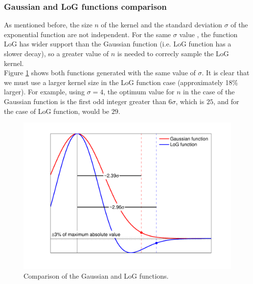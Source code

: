 \documentclass{ipol}
\numberwithin{equation}{section}
\numberwithin{table}{section}
\begin{document}

\subsubsection{Gaussian and LoG functions comparison}
\label{kernelcomparison}

As mentioned before, the size $n$ of the kernel and the standard deviation $\sigma$ of the exponential function 
are not independent. For the same $\sigma$ value , the function LoG has wider support than the
Gaussian function (i.e. LoG function has a slower decay), so a greater value of $n$ is needed to correcly sample the LoG kernel.\\

Figure \ref{fig:kernels} shows both functions generated with the same value of $\sigma$. It is clear that we must use a larger kernel size in the LoG function case (approximately 18\% larger). For 
example, using $\sigma=4$, the optimum value for $n$ in the case of the Gaussian function is the 
first odd integer greater than $6\sigma$, which is $25$, and for the case of LoG function, would 
be $29$.

\begin{figure}[ht]
	\centering
	\includegraphics[width=1.0\textwidth]{kernels.pdf}
	\caption{Comparison of the Gaussian and LoG functions.}
	\label{fig:kernels}
\end{figure}
\end{document}
